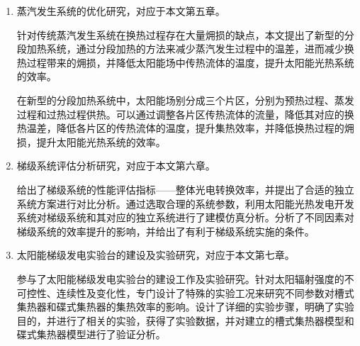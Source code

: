\begin{enumerate}[label=(\arabic*)]
	\item 蒸汽发生系统的优化研究，对应于本文第五章。
	
	针对传统蒸汽发生系统在换热过程存在大量㶲损的缺点，本文提出了新型的分段加热系统，通过分段加热的方法来减少蒸汽发生过程中的温差，进而减少换热过程带来的㶲损，并降低太阳能场中传热流体的温度，提升太阳能光热系统的效率。
	
	在新型的分段加热系统中，太阳能场别分成三个片区，分别为预热过程、蒸发过程和过热过程供热。可以通过调整各片区传热流体的流量，降低其对应的换热温差，降低各片区的传热流体的温度，提升集热效率，并降低换热过程的㶲损，提升太阳能光热系统的效率。

	\item 梯级系统评估分析研究，对应于本文第六章。
	
	给出了梯级系统的性能评估指标——整体光电转换效率，并提出了合适的独立系统方案进行对比分析。通过选取合理的系统参数，利用太阳能光热发电开发系统对梯级系统和其对应的独立系统进行了建模仿真分析。分析了不同因素对梯级系统的效率提升的影响，并给出了有利于梯级系统实施的条件。

	\item 太阳能梯级发电实验台的建设及实验研究，对应于本文第七章。
	
	参与了太阳能梯级发电实验台的建设工作及实验研究。针对太阳辐射强度的不可控性、连续性及变化性，专门设计了特殊的实验工况来研究不同参数对槽式集热器和碟式集热器的集热效率的影响。设计了详细的实验步骤，明确了实验目的，并进行了相关的实验，获得了实验数据，并对建立的槽式集热器模型和碟式集热器模型进行了验证分析。
\end{enumerate}
